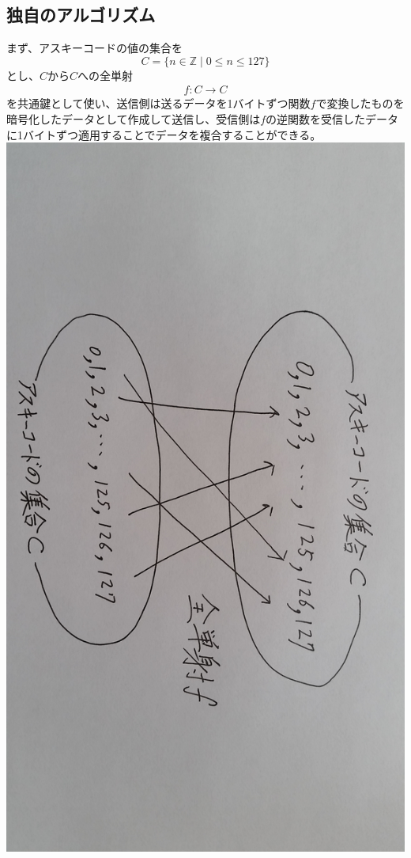 \documentclass[a4j]{celb-report}
\begin{document}
\subsection{独自のアルゴリズム}
まず、アスキーコードの値の集合を
\begin{equation}
	C = \bigl\{ n \in \mathbb{Z} \mid 0 \leq n \leq 127 \bigr\} \nonumber
\end{equation}
とし、$ C $から$ C $への全単射
\begin{eqnarray}
	f : C \rightarrow C \nonumber
\end{eqnarray}
を共通鍵として使い、送信側は送るデータを1バイトずつ関数$ f $で変換したものを暗号化したデータとして作成して送信し、受信側は$ f $の逆関数を受信したデータに1バイトずつ適用することでデータを複合することができる。\\
\includegraphics[width=15cm]{../caesar/algorithm.jpg}\\
\end{document}
